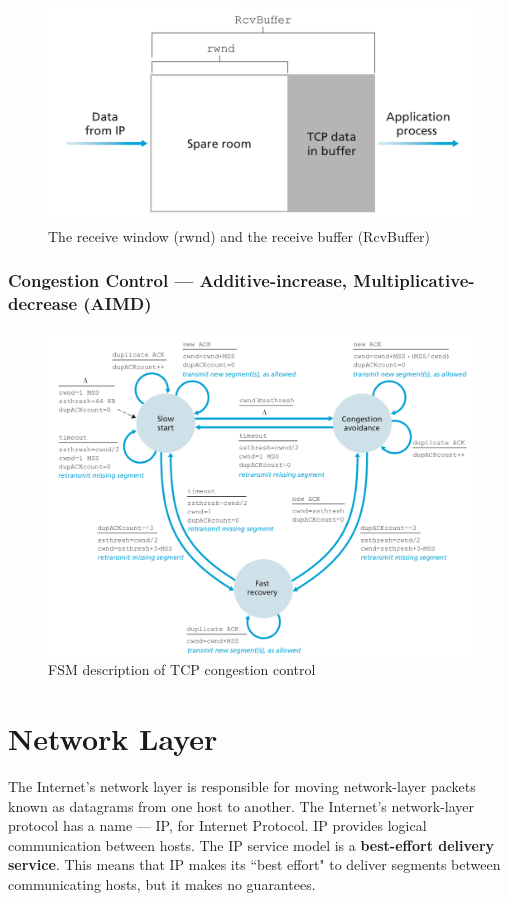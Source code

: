 \documentclass[11pt]{article}
\begin{document}
\begin{figure}[h]
	\centering
	\includegraphics[width=0.8\linewidth]{images/rwnd.png}
	\caption{The receive window (rwnd) and the receive buffer (RcvBuffer)}
	\label{fig:rwnd}
\end{figure}

\subsubsection{Congestion Control --- Additive-increase, Multiplicative-decrease (AIMD)}

\begin{figure}[h]
	\centering
	\includegraphics[width=0.9\linewidth]{images/CongestionControl.png}
	\caption{FSM description of TCP congestion control}
	\label{fig:CongestionControl}
\end{figure}

\section{Network Layer}

The Internet’s network layer is responsible for moving network-layer packets known as datagrams from one host to another. The Internet’s network-layer protocol has a name --- IP, for Internet Protocol. IP provides logical communication between hosts. The IP service model is a \textbf{best-effort delivery service}. This means that IP makes its ``best effort" to deliver segments between communicating hosts, but it makes no guarantees.
\end{document}
